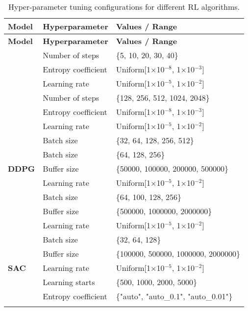 \begin{longtable}{|l|l|p{8cm}|}
    \hline
    \textbf{Model} & \textbf{Hyperparameter} & \textbf{Values / Range} \\ \midrule
    \endfirsthead

    \hline
    \textbf{Model} & \textbf{Hyperparameter} & \textbf{Values / Range} \\ \midrule
    \endhead

    \endfoot

    \multirow{3}{*}{\textbf{A2C}}
    & Number of steps & \{5, 10, 20, 30, 40\} \\
    & Entropy coefficient & Uniform[1$\times$10$^{-8}$, 1$\times$10$^{-3}$] \\ 
    & Learning rate & Uniform[1$\times$10$^{-5}$, 1$\times$10$^{-2}$] \\ \hline

    \pagebreak
    \multirow{4}{*}{\textbf{PPO}}
    & Number of steps & \{128, 256, 512, 1024, 2048\} \\ 
    & Entropy coefficient & Uniform[1$\times$10$^{-8}$, 1$\times$10$^{-3}$] \\ 
    & Learning rate & Uniform[1$\times$10$^{-5}$, 1$\times$10$^{-2}$] \\ 
    & Batch size & \{32, 64, 128, 256, 512\} \\ \hline

    \multirow{3}{*}{\textbf{DDPG}}
    & Batch size & \{64, 128, 256\} \\ 
    & Buffer size & \{50000, 100000, 200000, 500000\} \\ 
    & Learning rate & Uniform[1$\times$10$^{-5}$, 1$\times$10$^{-2}$] \\ \hline

    \pagebreak
    \multirow{3}{*}{\textbf{TD3}}
    & Batch size & \{64, 100, 128, 256\} \\ 
    & Buffer size & \{500000, 1000000, 2000000\} \\ 
    & Learning rate & Uniform[1$\times$10$^{-5}$, 1$\times$10$^{-2}$] \\ \hline

    \multirow{5}{*}{\textbf{SAC}}
    & Batch size & \{32, 64, 128\} \\ 
    & Buffer size & \{100000, 500000, 1000000, 2000000\} \\ 
    & Learning rate & Uniform[1$\times$10$^{-5}$, 1$\times$10$^{-2}$] \\ 
    & Learning starts & \{500, 1000, 2000, 5000\} \\ 
    & Entropy coefficient & \{"auto", "auto\_0.1", "auto\_0.01"\} \\ \hline
    \caption{Hyper-parameter tuning configurations for different RL algorithms.}
    \label{tab:model_hyperparameters}
\end{longtable}